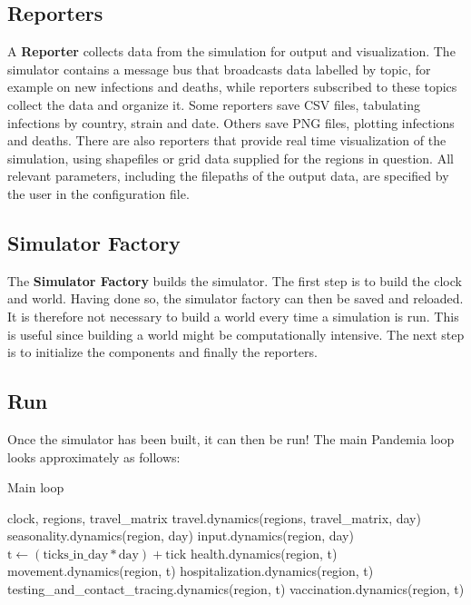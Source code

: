 \documentclass[10pt,letterpaper]{article}
\begin{document}
\subsection{Reporters}

A \textbf{Reporter} collects data from the simulation for output and visualization. The simulator contains a message bus that broadcasts data labelled by topic, for example on new infections and deaths, while reporters subscribed to these topics collect the data and organize it. Some reporters save CSV files, tabulating infections by country, strain and date. Others save PNG files, plotting infections and deaths. There are also reporters that provide real time visualization of the simulation, using shapefiles or grid data supplied for the regions in question. All relevant parameters, including the filepaths of the output data, are specified by the user in the configuration file.

\subsection{Simulator Factory}

The \textbf{Simulator Factory} builds the simulator. The first step is to build the clock and world. Having done so, the simulator factory can then be saved and reloaded. It is therefore not necessary to build a world every time a simulation is run. This is useful since building a world might be computationally intensive. The next step is to initialize the components and finally the reporters.

\subsection{Run}

Once the simulator has been built, it can then be run! The main Pandemia loop looks approximately as follows:

\begin{algorithm}
\caption{Main loop}\label{alg:mainloop}
\begin{algorithmic}
\Require clock, regions, travel{\_}matrix
\State travel.dynamics(regions, travel{\_}matrix, day)
\State seasonality.dynamics(region, day)
\State input.dynamics(region, day)
\State $\text{t} \gets (\text{ticks{\_}in{\_}day} * \text{day}) + \text{tick}$
\State health.dynamics(region, t)
\State movement.dynamics(region, t)
\State hospitalization.dynamics(region, t)
\EndFor
\State testing{\_}and{\_}contact{\_}tracing.dynamics(region, t)
\State vaccination.dynamics(region, t)
\EndFor
\EndFor
\end{algorithmic}
\end{algorithm}
\end{document}
